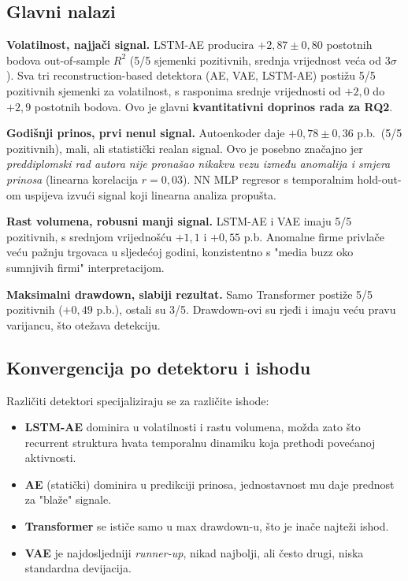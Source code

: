 \documentclass[diplomskirad,authoryear]{fer}
\begin{document}
\subsection{Glavni nalazi}

\textbf{Volatilnost, najjači signal.} LSTM-AE producira $+2{,}87 \pm 0{,}80$ postotnih bodova out-of-sample $R^2$ (5/5 sjemenki pozitivnih, srednja vrijednost veća od 3$\sigma$). Sva tri reconstruction-based detektora (AE, VAE, LSTM-AE) postižu 5/5 pozitivnih sjemenki za volatilnost, s rasponima srednje vrijednosti od $+2{,}0$ do $+2{,}9$ postotnih bodova. Ovo je glavni \textbf{kvantitativni doprinos rada za RQ2}.

\textbf{Godišnji prinos, prvi nenul signal.} Autoenkoder daje $+0{,}78 \pm 0{,}36$ p.b.\ (5/5 pozitivnih), mali, ali statistički realan signal. Ovo je posebno značajno jer \emph{preddiplomski rad autora nije pronašao nikakvu vezu između anomalija i smjera prinosa} (linearna korelacija $r=0{,}03$). NN MLP regresor s temporalnim hold-out-om uspijeva izvući signal koji linearna analiza propušta.

\textbf{Rast volumena, robusni manji signal.} LSTM-AE i VAE imaju 5/5 pozitivnih, s srednjom vrijednošću $+1{,}1$ i $+0{,}55$ p.b. Anomalne firme privlače veću pažnju trgovaca u sljedećoj godini, konzistentno s "media buzz oko sumnjivih firmi" interpretacijom.

\textbf{Maksimalni drawdown, slabiji rezultat.} Samo Transformer postiže 5/5 pozitivnih ($+0{,}49$ p.b.), ostali su 3/5. Drawdown-ovi su rjeđi i imaju veću pravu varijancu, što otežava detekciju.

\subsection{Konvergencija po detektoru i ishodu}

Različiti detektori specijaliziraju se za različite ishode:
\begin{itemize}
 \item \textbf{LSTM-AE} dominira u volatilnosti i rastu volumena, možda zato što recurrent struktura hvata temporalnu dinamiku koja prethodi povećanoj aktivnosti.
 \item \textbf{AE} (statički) dominira u predikciji prinosa, jednostavnost mu daje prednost za "blaže" signale.
 \item \textbf{Transformer} se ističe samo u max drawdown-u, što je inače najteži ishod.
 \item \textbf{VAE} je najdosljedniji \emph{runner-up}, nikad najbolji, ali često drugi, niska standardna devijacija.
\end{itemize}
\end{document}
